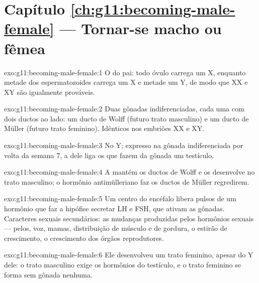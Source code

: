 \section*{Capítulo \ref{ch:g11:becoming-male-female} --- Tornar-se macho ou fêmea}

\begin{solution}{exo:g11:becoming-male-female:1}
O do pai: todo óvulo carrega um X, enquanto metade dos espermatozoides
carrega um X e metade um Y, de modo que XX e XY são igualmente prováveis.
\end{solution}

\begin{solution}{exo:g11:becoming-male-female:2}
Duas gônadas indiferenciadas, cada uma com dois ductos ao lado: um
ducto de Wolff (futuro trato masculino) e um ducto de Müller (futuro
trato feminino). Idênticos nos embriões XX e XY.
\end{solution}

\begin{solution}{exo:g11:becoming-male-female:3}
No  Y; expresso na gônada indiferenciada por volta da semana
7, a  dele liga os  que fazem da gônada um testículo.
\end{solution}

\begin{solution}{exo:g11:becoming-male-female:4}
A  mantém os ductos de Wolff e os desenvolve no trato
masculino; o hormônio antimülleriano faz os ductos de Müller regredirem.
\end{solution}

\begin{solution}{exo:g11:becoming-male-female:5}
Um centro do encéfalo libera pulsos de um hormônio que faz a hipófise
secretar LH e FSH, que ativam as gônadas. Caracteres sexuais
secundários: as mudanças produzidas pelos hormônios sexuais --- pelos,
voz, mamas, distribuição de músculo e de gordura, o estirão de
crescimento, o crescimento dos órgãos reprodutores.
\end{solution}

\begin{solution}{exo:g11:becoming-male-female:6}
Ele desenvolveu um trato feminino, apesar do  Y dele: o trato
masculino exige os hormônios do testículo, e o trato feminino se forma
sem gônada nenhuma.
\end{solution}

